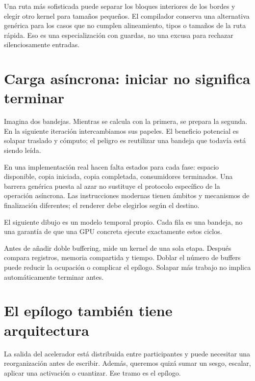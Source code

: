 \documentclass[12pt,a4paper,oneside]{report}
\begin{document}
Una ruta más sofisticada puede separar los bloques interiores de los bordes y elegir otro kernel para tamaños pequeños. El compilador conserva una alternativa genérica para los casos que no cumplen alineamiento, tipos o tamaños de la ruta rápida. Eso es una especialización con guardas, no una excusa para rechazar silenciosamente entradas.

\section{Carga asíncrona: iniciar no significa terminar}
Imagina dos bandejas. Mientras se calcula con la primera, se prepara la segunda. En la siguiente iteración intercambiamos sus papeles. El beneficio potencial es solapar traslado y cómputo; el peligro es reutilizar una bandeja que todavía está siendo leída.

En una implementación real hacen falta estados para cada fase: espacio disponible, copia iniciada, copia completada, consumidores terminados. Una barrera genérica puesta al azar no sustituye el protocolo específico de la operación asíncrona. Las instrucciones modernas tienen ámbitos y mecanismos de finalización diferentes; el renderer debe elegirlos según el destino. \cite{ptx}

El siguiente dibujo es un modelo temporal propio. Cada fila es una bandeja, no una garantía de que una GPU concreta ejecute exactamente estos ciclos.

\begin{center}
\end{center}
Antes de añadir doble buffering, mide un kernel de una sola etapa. Después compara registros, memoria compartida y tiempo. Doblar el número de buffers puede reducir la ocupación o complicar el epílogo. Solapar más trabajo no implica automáticamente terminar antes.

\section{El epílogo también tiene arquitectura}
La salida del acelerador está distribuida entre participantes y puede necesitar una reorganización antes de escribir. Además, queremos quizá sumar un sesgo, escalar, aplicar una activación o cuantizar. Ese tramo es el epílogo.
\end{document}
